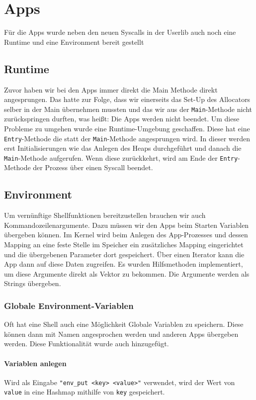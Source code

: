 \section{Apps}
Für die Apps wurde neben den neuen Syscalls in der Userlib auch noch eine Runtime und eine Environment bereit gestellt

\subsection{Runtime}
    Zuvor haben wir bei den Apps immer direkt die Main Methode direkt angesprungen. Das hatte zur Folge, dass wir einerseits das Set-Up des Allocators selber in der Main übernehmen mussten und das wir aus der \verb|Main|-Methode nicht zurückspringen durften, was heißt: Die Apps werden nicht beendet. Um diese Probleme zu umgehen wurde eine Runtime-Umgebung geschaffen. Diese hat eine \verb|Entry|-Methode die statt der \verb|Main|-Methode angesprungen wird. In dieser werden erst Initialisierungen wie das Anlegen des Heaps durchgeführt und danach die \verb|Main|-Methode aufgerufen. Wenn diese zurückkehrt, wird am Ende der \verb|Entry|-Methode der Prozess über einen Syscall beendet.

\subsection{Environment}
    Um vernünftige Shellfunktionen bereitzustellen brauchen wir auch Kommandozeilenargumente. Dazu müssen wir den Apps beim Starten Variablen übergeben können. Im Kernel wird beim Anlegen des App-Prozesses und dessen Mapping an eine feste Stelle im Speicher ein zusätzliches Mapping eingerichtet und die übergebenen Parameter dort gespeichert. Über einen Iterator kann die App dann auf diese Daten zugreifen. Es wurden Hilfsmethoden implementiert, um diese Argumente direkt als Vektor zu bekommen. Die Argumente werden als Strings übergeben.
    
    \subsubsection{Globale Environment-Variablen}
        Oft hat eine Shell auch eine Möglichkeit Globale Variablen zu speichern. Diese können dann mit Namen angesprochen werden und anderen Apps übergeben werden. Diese Funktionalität wurde auch hinzugefügt.
        \paragraph{Variablen anlegen}
            Wird als Eingabe \verb|"env_put <key> <value>"| verwendet, wird der Wert von \verb|value| in eine Hashmap mithilfe von \verb|key| gespeichert. 

